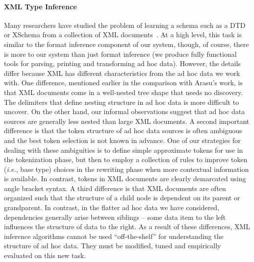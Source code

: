 \paragraph*{XML Type Inference}
Many researchers have studied the problem of learning
a schema such as a DTD or XSchema from a collection 
of XML documents~\cite{fernau:learning-xml,garofalakis+:xtract,bex+:inferring-xml-schema,bex+:dtd-inference}.  At a high level, this task is similar
to the format inference 
component of our system, though, of course, there is more
to our system than just format inference (we produce fully 
functional tools for parsing, printing and transforming ad hoc data).  
However, the details differ because
XML has different characteristics from the ad hoc data we
work with.  One difference, mentioned earlier in the comparison with
Arasu's work, is that XML documents come in a well-nested tree
shape that needs no discovery.  The delimiters that define nesting
structure in ad hoc data is more difficult to uncover.  On the other hand,
our informal observations suggest that ad hoc data sources are generally
less nested than large XML documents.  A second important difference
is that the token structure of ad hoc data sources is often ambiguous and
the best token selection is not known in advance.  
One of our strategies for dealing with
these ambiguities is to define simple approximate tokens for use
in the tokenization phase, but then to employ a collection of 
rules to improve token ({\em i.e.}, base type) choices in the rewriting phase
when more contextual information is available.  In contrast,
tokens in XML documents are clearly demarcated using angle bracket syntax.
A third difference is that XML documents are often organized such that
the structure of a child node is dependent on its parent or grandparent.
In contrast, in the flatter ad hoc data we have considered, dependencies
generally arise between siblings -- some data item to the left influences
the structure of data to the right.  As a result of these differences,
XML inference algorithms cannot be used ``off-the-shelf'' for understanding
the structure of ad hoc data.  They must be modified, tuned and
empirically evaluated on this new task.

